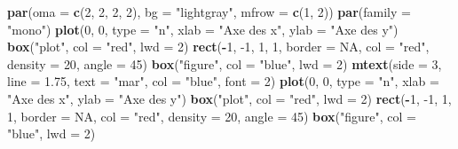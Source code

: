 \documentclass[]{article}
\newenvironment{Shaded}{\begin{snugshade}}{\end{snugshade}}
\newcommand{\DataTypeTok}[1]{\textcolor[rgb]{0.13,0.29,0.53}{#1}}
\newcommand{\DecValTok}[1]{\textcolor[rgb]{0.00,0.00,0.81}{#1}}
\newcommand{\FloatTok}[1]{\textcolor[rgb]{0.00,0.00,0.81}{#1}}
\newcommand{\KeywordTok}[1]{\textcolor[rgb]{0.13,0.29,0.53}{\textbf{#1}}}
\newcommand{\NormalTok}[1]{#1}
\newcommand{\OperatorTok}[1]{\textcolor[rgb]{0.81,0.36,0.00}{\textbf{#1}}}
\newcommand{\OtherTok}[1]{\textcolor[rgb]{0.56,0.35,0.01}{#1}}
\newcommand{\StringTok}[1]{\textcolor[rgb]{0.31,0.60,0.02}{#1}}
\begin{document}
\begin{Shaded}
\begin{Highlighting}[]
\KeywordTok{par}\NormalTok{(}\DataTypeTok{oma =} \KeywordTok{c}\NormalTok{(}\DecValTok{2}\NormalTok{, }\DecValTok{2}\NormalTok{, }\DecValTok{2}\NormalTok{, }\DecValTok{2}\NormalTok{), }\DataTypeTok{bg =} \StringTok{"lightgray"}\NormalTok{, }\DataTypeTok{mfrow =} \KeywordTok{c}\NormalTok{(}\DecValTok{1}\NormalTok{, }\DecValTok{2}\NormalTok{))}
\KeywordTok{par}\NormalTok{(}\DataTypeTok{family =} \StringTok{"mono"}\NormalTok{)}
\KeywordTok{plot}\NormalTok{(}\DecValTok{0}\NormalTok{, }\DecValTok{0}\NormalTok{, }\DataTypeTok{type =} \StringTok{"n"}\NormalTok{, }\DataTypeTok{xlab =} \StringTok{"Axe des x"}\NormalTok{, }\DataTypeTok{ylab =} \StringTok{"Axe des y"}\NormalTok{)}
\KeywordTok{box}\NormalTok{(}\StringTok{"plot"}\NormalTok{, }\DataTypeTok{col =} \StringTok{"red"}\NormalTok{, }\DataTypeTok{lwd =} \DecValTok{2}\NormalTok{)}
\KeywordTok{rect}\NormalTok{(}\OperatorTok{-}\DecValTok{1}\NormalTok{, }\DecValTok{-1}\NormalTok{, }\DecValTok{1}\NormalTok{, }\DecValTok{1}\NormalTok{, }\DataTypeTok{border =} \OtherTok{NA}\NormalTok{, }\DataTypeTok{col =} \StringTok{"red"}\NormalTok{, }\DataTypeTok{density =} \DecValTok{20}\NormalTok{, }\DataTypeTok{angle =} \DecValTok{45}\NormalTok{)}
\KeywordTok{box}\NormalTok{(}\StringTok{"figure"}\NormalTok{, }\DataTypeTok{col =} \StringTok{"blue"}\NormalTok{, }\DataTypeTok{lwd =} \DecValTok{2}\NormalTok{)}
\KeywordTok{mtext}\NormalTok{(}\DataTypeTok{side =} \DecValTok{3}\NormalTok{, }\DataTypeTok{line =} \FloatTok{1.75}\NormalTok{, }\DataTypeTok{text =} \StringTok{"mar"}\NormalTok{, }\DataTypeTok{col =} \StringTok{"blue"}\NormalTok{, }\DataTypeTok{font =} \DecValTok{2}\NormalTok{)}
\KeywordTok{plot}\NormalTok{(}\DecValTok{0}\NormalTok{, }\DecValTok{0}\NormalTok{, }\DataTypeTok{type =} \StringTok{"n"}\NormalTok{, }\DataTypeTok{xlab =} \StringTok{"Axe des x"}\NormalTok{, }\DataTypeTok{ylab =} \StringTok{"Axe des y"}\NormalTok{)}
\KeywordTok{box}\NormalTok{(}\StringTok{"plot"}\NormalTok{, }\DataTypeTok{col =} \StringTok{"red"}\NormalTok{, }\DataTypeTok{lwd =} \DecValTok{2}\NormalTok{)}
\KeywordTok{rect}\NormalTok{(}\OperatorTok{-}\DecValTok{1}\NormalTok{, }\DecValTok{-1}\NormalTok{, }\DecValTok{1}\NormalTok{, }\DecValTok{1}\NormalTok{, }\DataTypeTok{border =} \OtherTok{NA}\NormalTok{, }\DataTypeTok{col =} \StringTok{"red"}\NormalTok{, }\DataTypeTok{density =} \DecValTok{20}\NormalTok{, }\DataTypeTok{angle =} \DecValTok{45}\NormalTok{)}
\KeywordTok{box}\NormalTok{(}\StringTok{"figure"}\NormalTok{, }\DataTypeTok{col =} \StringTok{"blue"}\NormalTok{, }\DataTypeTok{lwd =} \DecValTok{2}\NormalTok{)}

\end{Highlighting}
\end{Shaded}
\end{document}
